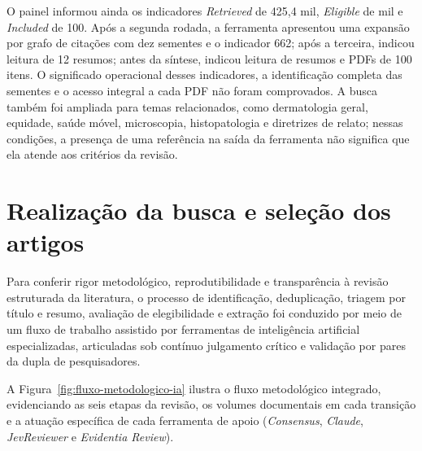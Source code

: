 O painel informou ainda os indicadores \textit{Retrieved} de 425,4 mil,
\textit{Eligible} de mil e \textit{Included} de 100. Após a segunda
rodada, a ferramenta apresentou uma expansão por grafo de citações com dez
sementes e o indicador 662; após a terceira, indicou leitura de 12
resumos; antes da síntese, indicou leitura de resumos e PDFs de 100 itens.
O significado operacional desses indicadores, a identificação completa
das sementes e o acesso integral a cada PDF não foram comprovados. A
busca também foi ampliada para temas relacionados, como dermatologia geral,
equidade, saúde móvel, microscopia, histopatologia e diretrizes de relato;
nessas condições, a presença de uma referência na saída da ferramenta não
significa que ela atende aos critérios da revisão.


\section{Realização da busca e seleção dos artigos}
\label{sec:execucao-busca-selecao}

Para conferir rigor metodológico, reprodutibilidade e transparência à revisão estruturada da literatura, o processo de identificação, deduplicação, triagem por título e resumo, avaliação de elegibilidade e extração foi conduzido por meio de um fluxo de trabalho assistido por ferramentas de inteligência artificial especializadas, articuladas sob contínuo julgamento crítico e validação por pares da dupla de pesquisadores.

A Figura~\ref{fig:fluxo-metodologico-ia} ilustra o fluxo metodológico integrado, evidenciando as seis etapas da revisão, os volumes documentais em cada transição e a atuação específica de cada ferramenta de apoio (\textit{Consensus}, \textit{Claude}, \textit{JevReviewer} e \textit{Evidentia Review}).

